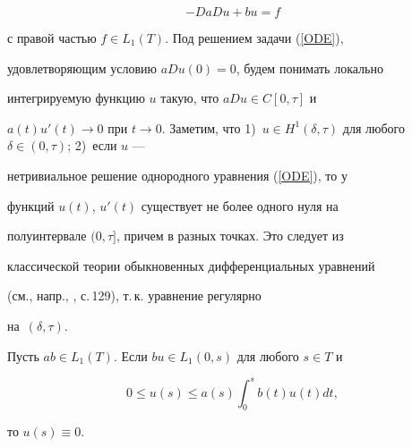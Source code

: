 \begin{equation}\label{ODE}


-DaDu+bu=f


\end{equation}


с правой частью $f \in L_1(T)$. Под решением задачи (\ref{ODE}),


удовлетворяющим условию $aDu(0)=0$, будем понимать локально


интегрируемую функцию $u$ такую, что $aDu \in C[0,\tau]$ и


$a(t)u'(t) \to 0$ при $t \to 0$. Заметим, что 1)~$u \in


H^1(\delta,\tau)$ для любого $\delta \in (0,\tau)$; 2)~если $u$ ---


нетривиальное решение однородного уравнения (\ref{ODE}), то у


функций $u(t)$, $u'(t)$ существует не более одного нуля на


полуинтервале $(0,\tau]$, причем в разных точках. Это следует из


классической теории обыкновенных дифференциальных уравнений


(см., напр., \cite{Tricomi}, с.\,129), т.\,к. уравнение регулярно


на~$(\delta,\tau)$.








\begin{lems}\label{Zero}


Пусть $ab \in L_1(T)$. Если $b u \in L_1(0,s)$ для любого $s \in T$ и


$$


0 \le u(s) \le a(s)\int_0^s b(t)u(t)dt,


$$


то $u(s)\equiv 0$.


\end{lems}








